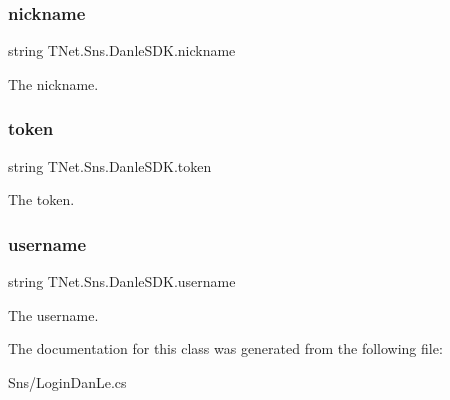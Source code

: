\subsubsection{\texorpdfstring{nickname}{nickname}}
{\footnotesize\ttfamily string T\+Net.\+Sns.\+Danle\+S\+D\+K.\+nickname}



The nickname. 

\mbox{\label{class_t_net_1_1_sns_1_1_danle_s_d_k_a140ff64a48ec8750cc5f280a3cb75ca4}} 
\subsubsection{\texorpdfstring{token}{token}}
{\footnotesize\ttfamily string T\+Net.\+Sns.\+Danle\+S\+D\+K.\+token}



The token. 

\mbox{\label{class_t_net_1_1_sns_1_1_danle_s_d_k_af129480f85aa59cc0e7fd8ec085a2437}} 
\subsubsection{\texorpdfstring{username}{username}}
{\footnotesize\ttfamily string T\+Net.\+Sns.\+Danle\+S\+D\+K.\+username}



The username. 



The documentation for this class was generated from the following file\+:\begin{DoxyCompactItemize}
\item 
Sns/Login\+Dan\+Le.\+cs\end{DoxyCompactItemize}
